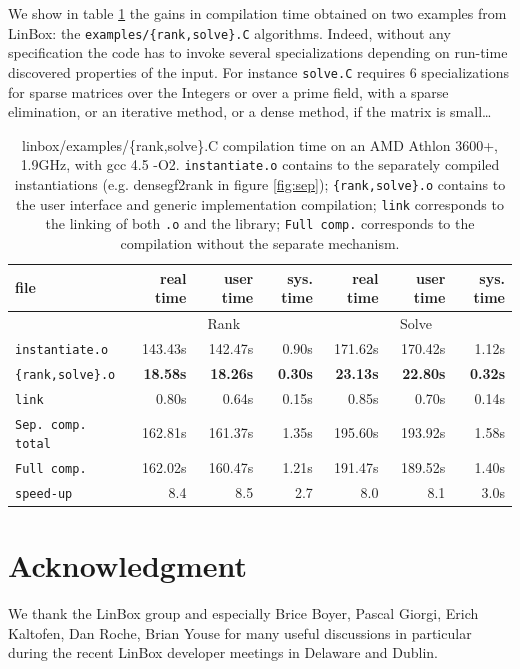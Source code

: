 \documentclass[runningheads,a4paper]{llncs}
\newcommand{\linbox}{{\sc LinBox}\xspace}
\begin{document}
We show in table \ref{tab:compilation} the gains in compilation time
obtained on two examples from \linbox: the \texttt{examples/\{rank,solve\}.C} algorithms. 
 Indeed, without any specification
 the code has to invoke several specializations depending on
 run-time discovered properties of the input. For instance
 \texttt{solve.C} requires 6 specializations for sparse
 matrices over the Integers or over a prime field, with a sparse
 elimination, or an iterative method, or a dense method, if the matrix
 is small\ldots
\vspace{-10pt}\begin{table}[ht]\center
\begin{tabular}{|l||r|r|r||r|r|r|}
\hline
file                      &  real time   &  user time   &  sys. time  &  real time   &  user time   &  sys. time \\
\hline
 & \multicolumn{3}{|c||}{Rank}& \multicolumn{3}{|c|}{Solve}\\
\hline
\texttt{instantiate.o} & 143.43s & 142.47s & 0.90s & 171.62s & 170.42s & 1.12s\\
\texttt{\{rank,solve\}.o} & \bf 18.58s & \bf 18.26s & \bf 0.30s & \bf 23.13s & \bf 22.80s & \bf 0.32s\\
\texttt{link} & 0.80s & 0.64s & 0.15s & 0.85s & 0.70s & 0.14s\\
\hline
\texttt{Sep. comp. total} & 162.81s & 161.37s & 1.35s & 195.60s & 193.92s & 1.58s\\
\hline
\texttt{Full comp.} & 162.02s & 160.47s & 1.21s & 191.47s & 189.52s & 1.40s\\
\hline
\hline
\texttt{speed-up} & 8.4 & 8.5 & 2.7 & 8.0 & 8.1 & 3.0s\\
\hline
\end{tabular} 
\caption{linbox/examples/\{rank,solve\}.C compilation time on an AMD
  Athlon 3600+, 1.9GHz, with gcc 4.5 -O2. \texttt{instantiate.o} contains to the separately compiled
  instantiations (e.g. densegf2rank in figure \ref{fig:sep});
  \texttt{\{rank,solve\}.o} contains to the user interface and generic
  implementation compilation; \texttt{link} corresponds to the linking
  of both \texttt{.o} and the library; \texttt{Full comp.} corresponds
  to the compilation without the separate
  mechanism.}\label{tab:compilation}
\end{table}\vspace{-30pt}
%
\section*{Acknowledgment}
We thank the \linbox group and especially Brice Boyer, Pascal Giorgi,
Erich Kaltofen, Dan Roche, Brian Youse for many useful discussions 
in particular during the recent \linbox developer meetings in
Delaware and Dublin.
%

 
%
\end{document}
